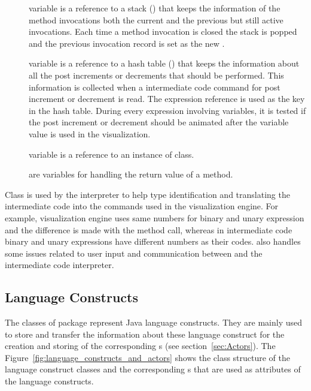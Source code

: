 \begin{description}
\item[] variable is a reference to a stack () that keeps the information of the method invocations both the current and the previous but still active invocations. Each time a method invocation is closed the stack is popped and the previous invocation record is set as the new .

\item[] variable is a reference to a hash table () that keeps the information about all the post increments or decrements that should be performed. This information is collected when a intermediate code command for post increment or decrement is read. The expression reference is used as the key in the hash table. During every expression involving variables, it is tested if the post increment or decrement should be animated after the variable value is used in the visualization.

\item[] variable is a reference to an instance of  class. 

\item[]

\item[]

\item[] are variables for handling the return value of a method.

\end{description}

Class  is used by the interpreter to help type identification and translating the intermediate code into the commands used in the visualization engine. For example, visualization engine uses same numbers for binary and unary expression and the difference is made with the method call, whereas in intermediate code binary and unary expressions have different numbers as their codes.  also handles some issues related to user input and communication between \djava{} and the intermediate code interpreter.

\subsection{Language Constructs}
\label{sec:Language_package}

The classes of  package represent Java language constructs. They are mainly used to store and transfer the information about these language construct for the creation and storing of the corresponding s (see section~\ref{sec:Actors}). The Figure~\ref{fig:language_constructs_and_actors} shows the class structure of the language construct classes and the corresponding s that are used as attributes of the language constructs.

